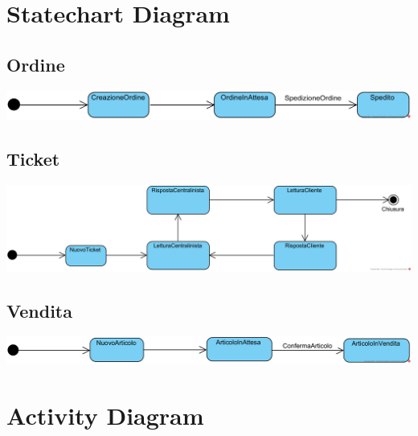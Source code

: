\documentclass[12pt]{article}
\begin{document}
\newpage

\section{Statechart Diagram}

\subsection{Ordine}
\includegraphics[width=\textwidth]{StateChart/Ordine}

\subsection{Ticket}
\includegraphics[width=\textwidth]{StateChart/Ticket}

\subsection{Vendita}
\includegraphics[width=\textwidth]{StateChart/Vendita}

\newpage

\section{Activity Diagram}
\end{document}
